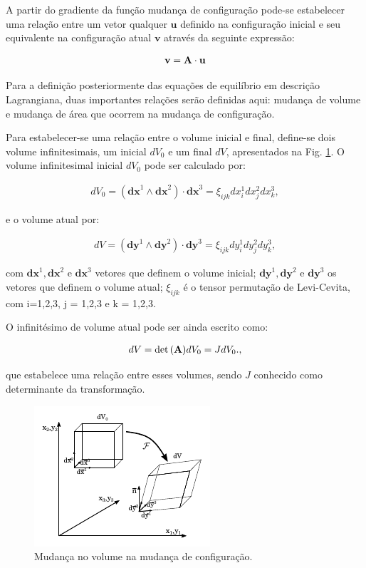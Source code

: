 \documentclass[tese_patricia]{subfiles}
\begin{document}
A partir do gradiente da função mudança de configuração pode-se estabelecer uma relação entre um vetor qualquer $\mathbf{u}$ definido na configuração inicial e seu equivalente na configuração atual $\mathbf{v}$ através da seguinte expressão:

\begin{align}
\mathbf{v} = \mathbf{A} \cdot \mathbf{u} \label{eq:RelVet}
\end{align}

Para a definição posteriormente das equações de equilíbrio em descrição Lagrangiana, duas importantes relações serão definidas aqui: mudança de volume e mudança de área que ocorrem na mudança de configuração.

Para estabelecer-se uma relação entre o volume inicial e final, define-se dois volume infinitesimais, um inicial $dV_{0}$ e um final $dV$, apresentados na Fig.  \ref{fig:DefVol}. O volume infinitesimal inicial $dV_{0}$ pode ser calculado por:

\begin{align}
dV_{0} = (\mathbf{dx}^{1} \wedge \mathbf{dx}^{2}) \cdot \mathbf{dx}^{3} =  \xi_{ijk}dx_{i}^{1} dx_{j}^{2} dx_{k}^{3},
\end{align}

\noindent e o volume atual por:

\begin{align}
dV = (\mathbf{dy}^{1} \wedge \mathbf{dy}^{2}) \cdot \mathbf{dy}^{3} = \xi_{ijk}dy_{i}^{1} dy_{j}^{2} dy_{k}^{3}, \label{eq:volatual}
\end{align}

\noindent com $\mathbf{dx}^1,\mathbf{dx}^2$ e $\mathbf{dx}^3$ vetores que definem o volume inicial; $\mathbf{dy}^1,\mathbf{dy}^2$ e $\mathbf{dy}^3$ os vetores que definem o volume atual; $\xi_{ijk}$ é o tensor permutação de Levi-Cevita, com i=1,2,3, j = 1,2,3 e k = 1,2,3.

O infinitésimo de volume atual pode ser ainda escrito como:

\begin{align}
dV = \det{\left(\mathbf{A}\right)} dV_{0} = JdV_{0}. \label {eq:relVol},
\end{align}

\noindent que estabelece uma relação entre esses volumes, sendo $J$ conhecido como determinante da transformação.

\begin{figure}[htb!]
	\centering
	\includegraphics[scale=2.0]{Imagens/Cap3/DefVol.pdf}	
	\caption{Mudança no volume na mudança de configuração.}
	\label{fig:DefVol}
\end{figure}
\end{document}
